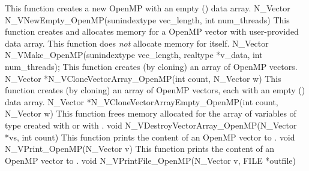 {
  This function creates a new OpenMP  with an empty () data array.
}
{
  N\_Vector N\_VNewEmpty\_OpenMP(sunindextype vec\_length, int num\_threads)
}
{
 This function creates and allocates memory for a OpenMP vector
 with user-provided data array. This function does {\em not} allocate memory for
  itself.
}
{
  N\_Vector N\_VMake\_OpenMP(sunindextype vec\_length, realtype *v\_data,
  int num\_threads);
}
{
  This function creates (by cloning) an array of  OpenMP vectors.
}
{
  N\_Vector *N\_VCloneVectorArray\_OpenMP(int count, N\_Vector w)
}
{
  This function creates (by cloning) an array of  OpenMP vectors, each with an
  empty () data array.
}
{
  N\_Vector *N\_VCloneVectorArrayEmpty\_OpenMP(int count, N\_Vector w)
}
{
  This function frees memory allocated for the array of  variables of type
   created with  or with
  .
}
{
 void N\_VDestroyVectorArray\_OpenMP(N\_Vector *vs, int count)
}
{
  This function prints the content of an OpenMP vector to .
}
{
  void N\_VPrint\_OpenMP(N\_Vector v)
}
{
  This function prints the content of an OpenMP vector to .
}
{
  void N\_VPrintFile\_OpenMP(N\_Vector v, FILE *outfile)
}

